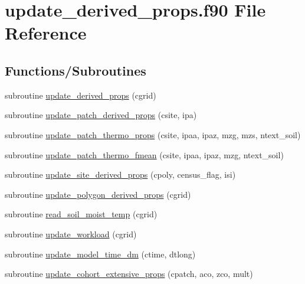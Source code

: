 \hypertarget{update__derived__props_8f90}{}\section{update\+\_\+derived\+\_\+props.\+f90 File Reference}
\label{update__derived__props_8f90}
\subsection*{Functions/\+Subroutines}
\begin{DoxyCompactItemize}
\item 
subroutine \hyperlink{update__derived__props_8f90_aca71347e6bbc44bc819245407450904d}{update\+\_\+derived\+\_\+props} (cgrid)
\item 
subroutine \hyperlink{update__derived__props_8f90_a4ec6edacfccb9d8d6f5a6d6e8f2c30a0}{update\+\_\+patch\+\_\+derived\+\_\+props} (csite, ipa)
\item 
subroutine \hyperlink{update__derived__props_8f90_a0133c9a113de9a317445ba7ecf008905}{update\+\_\+patch\+\_\+thermo\+\_\+props} (csite, ipaa, ipaz, mzg, mzs, ntext\+\_\+soil)
\item 
subroutine \hyperlink{update__derived__props_8f90_ac2c4d4bf81270f392d3947836f8fefa4}{update\+\_\+patch\+\_\+thermo\+\_\+fmean} (csite, ipaa, ipaz, mzg, ntext\+\_\+soil)
\item 
subroutine \hyperlink{update__derived__props_8f90_af158fc114990d9597c5c74cba3d27b88}{update\+\_\+site\+\_\+derived\+\_\+props} (cpoly, census\+\_\+flag, isi)
\item 
subroutine \hyperlink{update__derived__props_8f90_ac87223c8df24a1163bc81413d3add90e}{update\+\_\+polygon\+\_\+derived\+\_\+props} (cgrid)
\item 
subroutine \hyperlink{update__derived__props_8f90_a4366b89410929649291cd8a3280ed252}{read\+\_\+soil\+\_\+moist\+\_\+temp} (cgrid)
\item 
subroutine \hyperlink{update__derived__props_8f90_a26e0b3f2eb056299270873a3a87f17c7}{update\+\_\+workload} (cgrid)
\item 
subroutine \hyperlink{update__derived__props_8f90_a66aa9b305eb7b2330b15d5c8c37ed6b6}{update\+\_\+model\+\_\+time\+\_\+dm} (ctime, dtlong)
\item 
subroutine \hyperlink{update__derived__props_8f90_a2f20573c21f9be1d6c291f6c7f2af59e}{update\+\_\+cohort\+\_\+extensive\+\_\+props} (cpatch, aco, zco, mult)
\end{DoxyCompactItemize}


